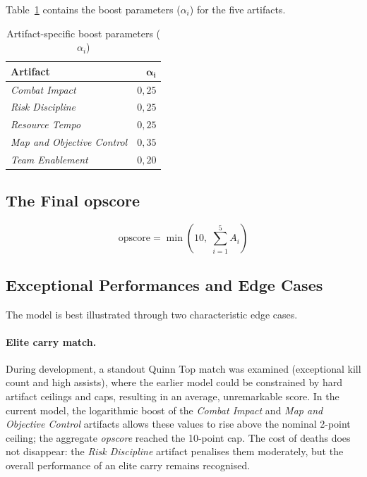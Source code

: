 Table~\ref{tab:overflow_params} contains the boost parameters ($\alpha_i$) for the five artifacts.

\begin{table}[H]
\centering
\caption{Artifact-specific boost parameters ($\alpha_i$)}
\label{tab:overflow_params}
\begin{tabular}{|l|r|}
\hline
\textbf{Artifact} & $\boldsymbol{\alpha_i}$ \\
\hline
\textit{Combat Impact}             & $0{,}25$ \\
\textit{Risk Discipline}           & $0{,}25$ \\
\textit{Resource Tempo}            & $0{,}25$ \\
\textit{Map and Objective Control} & $0{,}35$ \\
\textit{Team Enablement}           & $0{,}20$ \\
\hline
\end{tabular}
\end{table}

\subsection{The Final opscore}

\begin{equation}
\text{opscore} = \min\!\left(10,\; \sum_{i=1}^{5} A_i\right)
\end{equation}

\subsection{Exceptional Performances and Edge Cases}

The model is best illustrated through two characteristic edge cases.

\paragraph{Elite carry match.}
During development, a standout Quinn Top match was examined (exceptional kill count and high assists), where the earlier model could be constrained by hard artifact ceilings and caps, resulting in an average, unremarkable score. In the current model, the logarithmic boost of the \textit{Combat Impact} and \textit{Map and Objective Control} artifacts allows these values to rise above the nominal 2-point ceiling; the aggregate \textit{opscore} reached the 10-point cap. The cost of deaths does not disappear: the \textit{Risk Discipline} artifact penalises them moderately, but the overall performance of an elite carry remains recognised.

